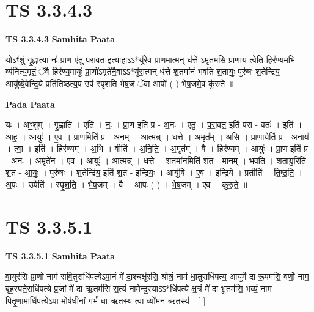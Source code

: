 \documentclass[17pt]{extarticle}
\begin{document}

\section{ TS 3.3.4.3 }

\textbf{TS 3.3.4.3 } \newline
\textbf{Samhita Paata} \newline

योऽꣳ॑शुं गृ॒ह्णात्या नः॑ प्रा॒ण ए॑तु परा॒वत॒ इत्या॒हाऽऽ*यु॑रे॒व प्रा॒णमा॒त्मन् ध॑त्ते॒ ऽमृत॑मसि प्रा॒णाय॒ त्वेति॒ हिर॑ण्यम॒भि व्य॑नित्य॒मृतं॒ ॅवै हिर॑ण्य॒मायुः॑ प्रा॒णो॑ऽमृते॑नै॒वाऽऽ*यु॑रा॒त्मन् ध॑त्ते श॒तमा॑नं भवति श॒तायुः॒ पुरु॑षः श॒तेन्द्रि॑य॒ आयु॑ष्ये॒वेन्द्रि॒ये प्रति॑तिष्ठत्य॒प उप॑ स्पृशति भेष॒जं ॅवा आपो॑ ( ) भेष॒जमे॒व कु॑रुते ॥ \newline

\textbf{Pada Paata} \newline

यः । अꣳ॒॒शुम् । गृ॒ह्णाति॑ । एति॑ । नः॒ । प्रा॒ण इति॑ प्र - अ॒नः । ए॒तु॒ । प॒रा॒वत॒ इति॑ परा - वतः॑ । इति॑ । आ॒ह॒ । आयुः॑ । ए॒व । प्रा॒णमिति॑ प्र - अ॒नम् । आ॒त्मन्न् । ध॒त्ते॒ । अ॒मृत᳚म् । अ॒सि॒ । प्रा॒णायेति॑ प्र - अ॒नाय॑ । त्वा॒ । इति॑ । हिर॑ण्यम् । अ॒भि । वीति॑ । अ॒नि॒ति॒ । अ॒मृत᳚म् । वै । हिर॑ण्यम् । आयुः॑ । प्रा॒ण इति॑ प्र - अ॒नः । अ॒मृते॑न । ए॒व । आयुः॑ । आ॒त्मन्न् । ध॒त्ते॒ । श॒तमा॑न॒मिति॑ श॒त - मा॒न॒म् । भ॒व॒ति॒ । श॒तायु॒रिति॑ श॒त - आ॒युः॒ । पुरु॑षः । श॒तेन्द्रि॑य॒ इति॑ श॒त - इ॒न्द्रि॒यः॒ । आयु॑षि । ए॒व । इ॒न्द्रि॒ये । प्रतीति॑ । ति॒ष्ठ॒ति॒ । अ॒पः । उपेति॑ । स्पृ॒श॒ति॒ । भे॒ष॒जम् । वै । आपः॑ ( ) । भे॒ष॒जम् । ए॒व । कु॒रु॒ते॒ ॥  \newline





\section{ TS 3.3.5.1 }

\textbf{TS 3.3.5.1 } \newline
\textbf{Samhita Paata} \newline

वा॒युर॑सि प्रा॒णो नाम॑ सवि॒तुराधि॑पत्येऽपा॒नं मे॑ दा॒श्चक्षु॑रसि॒ श्रोत्रं॒ नाम॑ धा॒तुराधि॑पत्य॒ आयु॑र्मे दा रू॒पम॑सि॒ वर्णो॒ नाम॒ बृह॒स्पते॒राधि॑पत्ये प्र॒जां मे॑ दा ऋ॒तम॑सि स॒त्यं नामेन्द्र॒स्याऽऽ*धि॑पत्ये क्ष॒त्रं मे॑ दा भू॒तम॑सि॒ भव्यं॒ नाम॑ पितृ॒णामाधि॑पत्ये॒ऽपा-मोष॑धीनां॒ गर्भं॑ धा ऋ॒तस्य॑ त्वा॒ व्यो॑मन ऋ॒तस्य॑ - [  ] \newline
\end{document}
